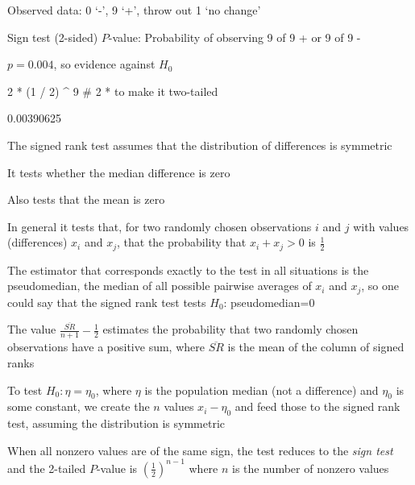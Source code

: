  \item Observed data: 0 `-', 9 `+', throw out 1 `no change' 
 \item Sign test (2-sided) $P$-value: Probability of observing 9 of 9
   + or 9 of 9 -
 \item $p = 0.004$, so evidence against $H_0$
 \ei
\ei
\begin{Schunk}
\begin{Sinput}
2 * (1 / 2) ^ 9    # 2 * to make it two-tailed
\end{Sinput}
\begin{Soutput}
[1] 0.00390625
\end{Soutput}
\end{Schunk}

\bi
\item The signed rank test assumes that the distribution of differences is
  symmetric
\item It tests whether the median difference is zero
\item Also tests that the mean is zero
\item In general it tests that, for two randomly chosen observations
  $i$ and $j$ with values (differences) $x_i$ and $x_j$, that the
  probability that $x_{i}+x_{j} > 0$ is $\frac{1}{2}$
\item The estimator that corresponds exactly to the test in all
  situations is the pseudomedian, the median of all possible pairwise
  averages of $x_i$ and $x_j$, so one could say that the signed rank
  test tests $H_{0}$: pseudomedian=0
\item The value $\frac{\overline{SR}}{n+1}-\frac{1}{2}$ estimates the
  probability that two randomly chosen observations have a positive
  sum, where $\overline{SR}$ is the mean of the column of signed ranks
\item To test $H_{0}:\eta=\eta_{0}$, where $\eta$ is the population median
  (not a difference) and $\eta_{0}$ is some constant, we create the $n$ values
  $x_{i} - \eta_{0}$ and feed those to the signed rank test, assuming
  the distribution is symmetric
\item When all nonzero values are of the same sign, the test reduces
  to the \emph{sign test} and the 2-tailed $P$-value is
  $(\frac{1}{2})^{n-1}$ where $n$ is the number of nonzero values
\ei

